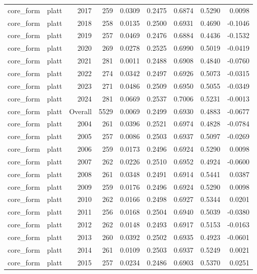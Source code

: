 \begin{table}[t]
\begin{tabular}{@{} l l r r r r r r r @{} }
      core\_form & platt & 2017 & 259 & 0.0309 & 0.2475 & 0.6874 & 0.5290 & 0.0098 \\
      core\_form & platt & 2018 & 258 & 0.0135 & 0.2500 & 0.6931 & 0.4690 & -0.1046 \\
      core\_form & platt & 2019 & 257 & 0.0469 & 0.2476 & 0.6884 & 0.4436 & -0.1532 \\
      core\_form & platt & 2020 & 269 & 0.0278 & 0.2525 & 0.6990 & 0.5019 & -0.0419 \\
      core\_form & platt & 2021 & 281 & 0.0011 & 0.2488 & 0.6908 & 0.4840 & -0.0760 \\
      core\_form & platt & 2022 & 274 & 0.0342 & 0.2497 & 0.6926 & 0.5073 & -0.0315 \\
      core\_form & platt & 2023 & 271 & 0.0486 & 0.2509 & 0.6950 & 0.5055 & -0.0349 \\
      core\_form & platt & 2024 & 281 & 0.0669 & 0.2537 & 0.7006 & 0.5231 & -0.0013 \\
      core\_form & platt & Overall & 5529 & 0.0069 & 0.2499 & 0.6930 & 0.4883 & -0.0677 \\
      core\_form & platt & 2004 & 261 & 0.0396 & 0.2521 & 0.6974 & 0.4828 & -0.0784 \\
      core\_form & platt & 2005 & 257 & 0.0086 & 0.2503 & 0.6937 & 0.5097 & -0.0269 \\
      core\_form & platt & 2006 & 259 & 0.0173 & 0.2496 & 0.6924 & 0.5290 & 0.0098 \\
      core\_form & platt & 2007 & 262 & 0.0226 & 0.2510 & 0.6952 & 0.4924 & -0.0600 \\
      core\_form & platt & 2008 & 261 & 0.0348 & 0.2491 & 0.6914 & 0.5441 & 0.0387 \\
      core\_form & platt & 2009 & 259 & 0.0176 & 0.2496 & 0.6924 & 0.5290 & 0.0098 \\
      core\_form & platt & 2010 & 262 & 0.0166 & 0.2498 & 0.6927 & 0.5344 & 0.0201 \\
      core\_form & platt & 2011 & 256 & 0.0168 & 0.2504 & 0.6940 & 0.5039 & -0.0380 \\
      core\_form & platt & 2012 & 262 & 0.0148 & 0.2493 & 0.6917 & 0.5153 & -0.0163 \\
      core\_form & platt & 2013 & 260 & 0.0392 & 0.2502 & 0.6935 & 0.4923 & -0.0601 \\
      core\_form & platt & 2014 & 261 & 0.0109 & 0.2503 & 0.6937 & 0.5249 & 0.0021 \\
      core\_form & platt & 2015 & 257 & 0.0234 & 0.2486 & 0.6903 & 0.5370 & 0.0251 \\

\end{tabular}
\end{table}
